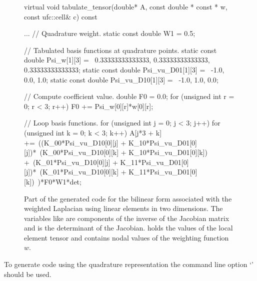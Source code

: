 \begin{figure}
\begin{code}
virtual void tabulate_tensor(double* A,
                             const double * const * w,
                             const ufc::cell& c) const
{
  ...
  // Quadrature weight.
  static const double W1 = 0.5;

  // Tabulated basis functions at quadrature points.
  static const double Psi_w[1][3] = \
  {{0.33333333333333, 0.33333333333333, 0.33333333333333}};
  static const double Psi_vu_D01[1][3] = \
  {{-1.0, 0.0, 1.0}};
  static const double Psi_vu_D10[1][3] = \
  {{-1.0, 1.0, 0.0}};

  // Compute coefficient value.
  double F0 = 0.0;
  for (unsigned int r = 0; r < 3; r++)
    F0 += Psi_w[0][r]*w[0][r];

  // Loop basis functions.
  for (unsigned int j = 0; j < 3; j++)
  {
    for (unsigned int k = 0; k < 3; k++)
    {
      A[j*3 + k] +=\
      ((K_00*Psi_vu_D10[0][j] + K_10*Psi_vu_D01[0][j])*\
       (K_00*Psi_vu_D10[0][k] + K_10*Psi_vu_D01[0][k]) +\
       (K_01*Psi_vu_D10[0][j] + K_11*Psi_vu_D01[0][j])*\
       (K_01*Psi_vu_D10[0][k] + K_11*Psi_vu_D01[0][k])\
      )*F0*W1*det;
    }
  }
}
\end{code}
\caption{Part of the generated code for the bilinear form associated with the
         weighted Laplacian using linear
         elements in two dimensions. The variables like  are
         components of the inverse of the Jacobian matrix and 
         is the determinant of the Jacobian.  holds the values of the
         local element tensor and  contains nodal values of
         the weighting function~$w$.}
\label{oelgaard-2:fig:standard_code}
\end{figure}

To generate code using the quadrature representation the \ffc{}
command line option `\emp{-r quadrature}' should be used.
%
